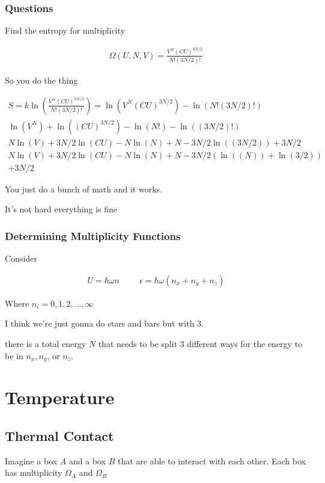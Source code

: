 \documentclass[fleqn]{report}
\newcommand{\hp}{\hspace{1cm}}
\newcommand{\equations} [1] {
\begin{gather*}
#1
\end{gather*}
}
\begin{document}
\subsection{Questions}
Find the entropy for multiplicity 

\equations{
    \Omega(U, N, V)
    =
    \frac{V^N (CU)^{3N/2}}
    {N! (3N / 2)!}
}

So you do the thing 

\equations{
    S 
    =
    k 
    \ln(
    \frac{V^N (CU)^{3N/2}}
    {N! (3N / 2)!}
    )
    =
    \ln(
    V^N (CU)^{3N/2}
    )
    -
    \ln(
    N! (3N / 2)!
    )
    \\
    \ln(
    V^N
    )
    + \ln(
    (CU)^{3N/2}
    )
    -
    \ln(
    N!
    )
    - \ln(
    (3N / 2)!
    )
    \\
    N \ln(
    V
    )
    + 3N/2\ln(
    CU
    )
    -
    N\ln(
    N
    )
    +N
    -3N / 2 \ln(
    (3N / 2)
    )
    +3N / 2
    \\
    N \ln(
    V
    )
    + 3N/2\ln(
    CU
    )
    -
    N\ln(
    N
    )
    +N
    -3N / 2 \left(
    \ln(
    (N)
    )
    + \ln(3/2)
    \right)
    \\
    +3N / 2
}

You just do a bunch of math and it works. 

It's not hard everything is fine 

\subsection{Determining Multiplicity Functions}
Consider 
\equations{
    U = \hbar \omega n 
    \hp 
    \epsilon 
    =
    \hbar \omega 
    (n_x + n_y + n_z)
}
Where $n_i = 0, 1, 2, \ldots, \infty$ 

I think we're just gonna do stars and bars but with 3. 

there is a total energy $N$ that needs to be split $3$ different ways 
for the energy to be in $n_x, n_y$, or $n_z$. 

\chapter{Temperature}

\section{Thermal Contact}
Imagine a box $A$ and a box $B$ that are able to interact with each other. 
Each box has multiplicity $\Omega_A$ and $\Omega_B$
\end{document}
